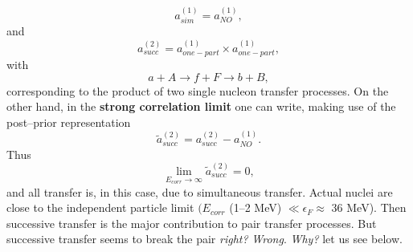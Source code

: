 \begin{equation}
a_{sim}^{(1)}=a_{NO}^{(1)},
\end{equation}
and
\begin{equation}
a_{succ}^{(2)}=a_{one-part}^{(1)}\times a_{one-part}^{(1)},
\end{equation}
\vspace{0.2cm}
with
\begin{equation}
a+A\rightarrow f+F \rightarrow b+B,
\end{equation}         
corresponding to the product of two single nucleon transfer processes.
On the other hand, in the \textbf{strong correlation limit} one can write, making use of the
post--prior representation
\begin{equation}
\tilde a_{succ}^{(2)}= a_{succ}^{(2)}-a_{NO}^{(1)}.
\end{equation}
Thus
\begin{equation}
\lim_{E_{corr}\rightarrow \infty} \tilde a_{succ}^{(2)}=0,
\end{equation}
and all transfer is, in this case, due to simultaneous transfer.
Actual nuclei are close to the independent particle limit $(E_{corr}$ (1--2 MeV) $\ll \epsilon_F\approx$ 36 MeV). Then successive transfer is the major contribution to pair transfer processes. But successive transfer seems to break the pair \textit{right?} \textit{Wrong}. \textit{Why?} let us see below.
